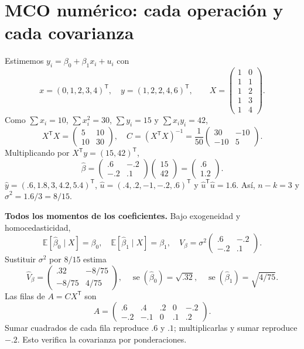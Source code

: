 \documentclass[11pt,a4paper]{article}
\newcommand{\E}{\mathbb E}
\newcommand{\T}{^{\mathsf T}}
\newcommand{\topic}[2]{\clearpage\section{#1}\label{#2}}
\theoremstyle{definition}\newtheorem{definicion}[teorema]{Definición}
\begin{document}
\topic{MCO numérico: cada operación y cada covarianza}{s38}
Estimemos $y_i=\beta_0+\beta_1x_i+u_i$ con
\[
x=(0,1,2,3,4)\T,\quad y=(1,2,2,4,6)\T,\qquad
X=\begin{pmatrix}1&0\\1&1\\1&2\\1&3\\1&4\end{pmatrix}.
\]
Como $\sum x_i=10$, $\sum x_i^2=30$, $\sum y_i=15$ y
$\sum x_iy_i=42$,
\[
X\T X=\begin{pmatrix}5&10\\10&30\end{pmatrix},\quad
C=(X\T X)^{-1}=\frac1{50}\begin{pmatrix}30&-10\\-10&5\end{pmatrix}.
\]
Multiplicando por $X\T y=(15,42)\T$,
\[
\widehat\beta=
\begin{pmatrix}.6&-.2\\-.2&.1\end{pmatrix}
\begin{pmatrix}15\\42\end{pmatrix}
=\begin{pmatrix}.6\\1.2\end{pmatrix}.
\]
$\widehat y=(.6,1.8,3,4.2,5.4)\T$,
$\widehat u=(.4,.2,-1,-.2,.6)\T$ y
$\widehat u\T\widehat u=1.6$.
Así, $n-k=3$ y $\widehat\sigma^2=1.6/3=8/15$.

\textbf{Todos los momentos de los coeficientes.}
Bajo exogeneidad y homocedasticidad,
\[
\E[\widehat\beta_0\mid X]=\beta_0,\quad
\E[\widehat\beta_1\mid X]=\beta_1,\quad
V_\beta=\sigma^2\begin{pmatrix}.6&-.2\\-.2&.1\end{pmatrix}.
\]
Sustituir $\sigma^2$ por $8/15$ estima
\[
\widehat V_\beta=\begin{pmatrix}.32&-8/75\\-8/75&4/75\end{pmatrix},
\quad
\operatorname{se}(\widehat\beta_0)=\sqrt{.32},
\quad \operatorname{se}(\widehat\beta_1)=\sqrt{4/75}.
\]
Las filas de $A=CX\T$ son
\[
A=\begin{pmatrix}.6&.4&.2&0&-.2\\-.2&-.1&0&.1&.2\end{pmatrix}.
\]
Sumar cuadrados de cada fila reproduce $.6$ y $.1$; multiplicarlas
y sumar reproduce $-.2$. Esto verifica la covarianza por ponderaciones.
\end{document}
